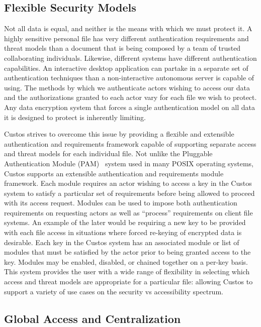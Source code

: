 \subsection{Flexible Security Models}

Not all data is equal, and neither is the means with which we must
protect it. A highly sensitive personal file has very different
authentication requirements and threat models than a document that is
being composed by a team of trusted collaborating
individuals. Likewise, different systems have different authentication
capabilities. An interactive desktop application can partake in a
separate set of authentication techniques than a non-interactive
autonomous server is capable of using. The methods by which we
authenticate actors wishing to access our data and the authorizations
granted to each actor vary for each file we wish to protect. Any data
encryption system that forces a single authentication model on all
data it is designed to protect is inherently limiting.

Custos strives to overcome this issue by providing a flexible and
extensible authentication and requirements framework capable of
supporting separate access and threat models for each individual
file. Not unlike the Pluggable Authentication Module
(PAM)~\cite{linux-pam} system used in many POSIX operating systems,
Custos supports an extensible authentication and requirements module
framework. Each module requires an actor wishing to access a key in
the Custos system to satisfy a particular set of requirements before
being allowed to proceed with its access request. Modules can be used
to impose both authentication requirements on requesting actors as
well as ``process'' requirements on client file systems. An example of
the later would be requiring a new key to be provided with each file
access in situations where forced re-keying of encrypted data is
desirable. Each key in the Custos system has an associated module or
list of modules that must be satisfied by the actor prior to being
granted access to the key. Modules may be enabled, disabled, or
chained together on a per-key basis. This system provides the user
with a wide range of flexibility in selecting which access and threat
models are appropriate for a particular file: allowing Custos to
support a variety of use cases on the security vs accessibility
spectrum.

\subsection{Global Access and Centralization}

